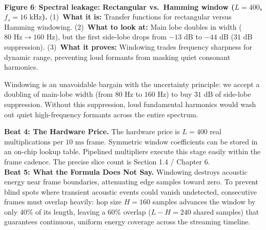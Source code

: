 \documentclass[11pt,a4paper]{article}
\begin{document}
\begin{center}
\begin{minipage}{\textwidth}
{%
}\\[1mm]
\begin{minipage}{0.96\textwidth}
\small\textbf{Figure 6}: \textbf{Spectral leakage: Rectangular vs.\ Hamming window ($L = 400$, $f_s = 16\text{ kHz}$).} (1)~\textbf{What it is:} Transfer functions for rectangular versus Hamming windowing. (2)~\textbf{What to look at:} Main lobe doubles in width ($80\text{ Hz} \to 160\text{ Hz}$), but the first side-lobe drops from $-13\text{ dB}$ to $-44\text{ dB}$ ($31\text{ dB}$ suppression). (3)~\textbf{What it proves:} Windowing trades frequency sharpness for dynamic range, preventing loud formants from masking quiet consonant harmonics.
\end{minipage}
\end{minipage}
\end{center}
\vspace{-3.5mm}

\begin{physicalinsight}
Windowing is an unavoidable bargain with the uncertainty principle: we accept a doubling of main-lobe width (from $80\text{ Hz}$ to $160\text{ Hz}$) to buy $31\text{ dB}$ of side-lobe suppression. Without this suppression, loud fundamental harmonics would wash out quiet high-frequency formants across the entire spectrum.
\end{physicalinsight}

\vspace{1mm}
{\small
\textbf{Beat 4: The Hardware Price.} The hardware price is $L = 400$ real multiplications per $10\text{ ms}$ frame. Symmetric window coefficients can be stored in an on-chip lookup table. Pipelined multipliers execute this stage easily within the frame cadence. The precise slice count is Section 1.4 / Chapter 6.\\[1mm]
\textbf{Beat 5: What the Formula Does Not Say.} Windowing destroys acoustic energy near frame boundaries, attenuating edge samples toward zero. To prevent blind spots where transient acoustic events could vanish undetected, consecutive frames must overlap heavily: hop size $H = 160$ samples advances the window by only $40\%$ of its length, leaving a $60\%$ overlap ($L - H = 240$ shared samples) that guarantees continuous, uniform energy coverage across the streaming timeline.
}
\end{document}
